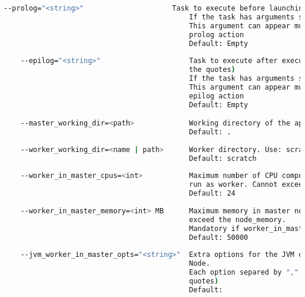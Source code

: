 \begin{lstlisting}[language=bash]
    --prolog="<string>"                     Task to execute before launching COMPSs (Notice the quotes)
                                            If the task has arguments split them by "," rather than spaces.
                                            This argument can appear multiple times for more than one
                                            prolog action
                                            Default: Empty
                                            
    --epilog="<string>"                     Task to execute after executing the COMPSs application (Notice
                                            the quotes)
                                            If the task has arguments split them by "," rather than spaces.
                                            This argument can appear multiple times for more than one
                                            epilog action
                                            Default: Empty

    --master_working_dir=<path>             Working directory of the application
                                            Default: .
                                            
    --worker_working_dir=<name | path>      Worker directory. Use: scratch | gpfs | <path>
                                            Default: scratch
                                              
    --worker_in_master_cpus=<int>           Maximum number of CPU computing units that the master node can
                                            run as worker. Cannot exceed cpus_per_node.
                                            Default: 24
                                            
    --worker_in_master_memory=<int> MB      Maximum memory in master node assigned to the worker. Cannot
                                            exceed the node_memory.
                                            Mandatory if worker_in_master_cpus is specified.
                                            Default: 50000
                                            
    --jvm_worker_in_master_opts="<string>"  Extra options for the JVM of the COMPSs Worker in the Master
                                            Node. 
                                            Each option separed by "," and without blank spaces (Notice the
                                            quotes)
                                            Default: 
                                            

\end{lstlisting}
